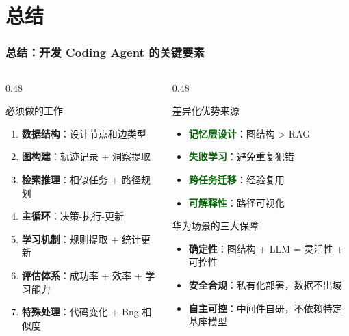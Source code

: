\documentclass[aspectratio=169,10pt]{beamer}
\begin{document}
\section{总结}

\begin{frame}
  \frametitle{总结：开发 Coding Agent 的关键要素}

  \begin{columns}[T]
    \begin{column}{0.48\textwidth}
      \begin{block}{必须做的工作}
        \footnotesize
        \begin{enumerate}
          \item \textbf{数据结构}：设计节点和边类型
          \item \textbf{图构建}：轨迹记录 + 洞察提取
          \item \textbf{检索推理}：相似任务 + 路径规划
          \item \textbf{主循环}：决策-执行-更新
          \item \textbf{学习机制}：规则提取 + 统计更新
          \item \textbf{评估体系}：成功率 + 效率 + 学习能力
          \item \textbf{特殊处理}：代码变化 + Bug 相似度
        \end{enumerate}
      \end{block}
    \end{column}

    \begin{column}{0.48\textwidth}
      \begin{block}{差异化优势来源}
        \footnotesize
        \begin{itemize}
          \item \textcolor{darkgreen}{\textbf{记忆层设计}}：图结构 > RAG
          \item \textcolor{darkgreen}{\textbf{失败学习}}：避免重复犯错
          \item \textcolor{darkgreen}{\textbf{跨任务迁移}}：经验复用
          \item \textcolor{darkgreen}{\textbf{可解释性}}：路径可视化
        \end{itemize}
      \end{block}

      \vspace{0.2cm}

      \begin{block}{华为场景的三大保障}
        \footnotesize
        \begin{itemize}
          \item \textbf{确定性}：图结构 + LLM = 灵活性 + 可控性
          \item \textbf{安全合规}：私有化部署，数据不出域
          \item \textbf{自主可控}：中间件自研，不依赖特定基座模型
        \end{itemize}
      \end{block}


\end{column}
\end{columns}
\end{frame}
\end{document}
